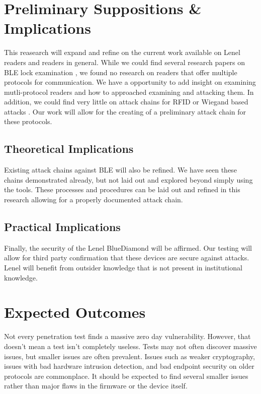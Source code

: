 \documentclass[10pt,twocolumn,letterpaper]{article}
\begin{document}
\section{Preliminary Suppositions \& Implications}
This reasearch will expand and refine on the current work available on Lenel readers and readers in general. While we could find several research papers on BLE lock examination \cite{matthewrs2017surveydoorlock}\cite{ho2016smart}\cite{ye2017security}\cite{8887393}, we found no research on readers that offer multiple protocols for communication. We have a opportunity to add insight on examining mutli-protocol readers and how to approached examining and attacking them. In addition, we could find very little on attack chains for RFID or Wiegand based attacks \cite{chung2017wiegand}. Our work will allow for the creating of a preliminary attack chain for these protocols.

\subsection{Theoretical Implications}
Existing attack chains against BLE will also be refined. We have seen these chains demonstrated \cite{lonzetta2018security}\cite{BluetoothMITMTal} already, but not laid out and explored beyond simply using the tools. These processes and procedures can be laid out and refined in this research allowing for a properly documented attack chain.

\subsection{Practical Implications}
Finally, the security of the Lenel BlueDiamond will be affirmed. Our testing will allow for third party confirmation that these devices are secure against attacks. Lenel will benefit from outsider knowledge that is not present in institutional knowledge.

\section{Expected Outcomes}
Not every penetration test finds a massive zero day vulnerability.  However, that doesn't mean a test isn't completely useless.  Tests may not often discover massive issues, but smaller issues are often prevalent.  Issues such as weaker cryptography, issues with bad hardware intrusion detection, and bad endpoint security on older protocols are commonplace.  It should be expected to find several smaller issues rather than major flaws in the firmware or the device itself.
\end{document}
